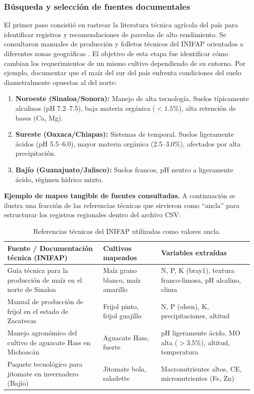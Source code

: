 \documentclass[12pt]{article}
\begin{document}
\subsubsection*{Búsqueda y selección de fuentes documentales}
El primer paso consistió en rastrear la literatura técnica agrícola del país para identificar registros y recomendaciones de parcelas de alto rendimiento. Se consultaron manuales de producción y folletos técnicos del INIFAP orientados a diferentes zonas geográficas \citep{inifap_2019}. El objetivo de esta etapa fue identificar cómo cambian los requerimientos de un mismo cultivo dependiendo de su entorno. Por ejemplo, documentar que el maíz del sur del país enfrenta condiciones del suelo diametralmente opuestas al del norte:

\begin{enumerate}
    \item \textbf{Noroeste (Sinaloa/Sonora):} Manejo de alta tecnología. Suelos típicamente alcalinos (pH 7.2--7.5), baja materia orgánica ($<1.5\%$), alta retención de bases (Ca, Mg).
    \item \textbf{Sureste (Oaxaca/Chiapas):} Sistemas de temporal. Suelos ligeramente ácidos (pH 5.5--6.0), mayor materia orgánica (2.5--3.0\%), afectados por alta precipitación.
    \item \textbf{Bajío (Guanajuato/Jalisco):} Suelos francos, pH neutro a ligeramente ácido, régimen hídrico mixto.
\end{enumerate}

\noindent\textbf{Ejemplo de mapeo tangible de fuentes consultadas.} A continuación se ilustra una fracción de las referencias técnicas que sirvieron como ``ancla'' para estructurar los registros regionales dentro del archivo CSV:

\begin{table}[htpb]
\centering
\caption{Referencias técnicas del INIFAP utilizadas como valores ancla.}
\label{tab:fuentes_inifap}
\begin{tabular}{p{5cm} p{3.5cm} p{5cm}}
\toprule
\textbf{Fuente / Documentación técnica (INIFAP)} & \textbf{Cultivos mapeados} & \textbf{Variables extraídas} \\
\midrule
Guía técnica para la producción de maíz en el norte de Sinaloa & Maíz grano blanco, maíz amarillo & N, P, K (bray1), textura franco-limosa, pH alcalino, clima \\
Manual de producción de frijol en el estado de Zacatecas & Frijol pinto, frijol guajillo & N, P (olsen), K, precipitaciones, altitud \\
Manejo agronómico del cultivo de aguacate Hass en Michoacán & Aguacate Hass, fuerte & pH ligeramente ácido, MO alta ($>$3.5\%), altitud, temperatura \\
Paquete tecnológico para jitomate en invernadero (Bajío) & Jitomate bola, saladette & Macronutrientes altos, CE, micronutrientes (Fe, Zn) \\
\bottomrule
\end{tabular}
\end{table}
\end{document}

